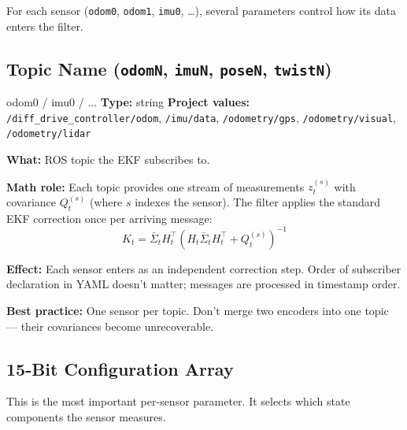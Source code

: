 \documentclass[11pt,a4paper]{article}
\begin{document}
For each sensor (\texttt{odom0}, \texttt{odom1}, \texttt{imu0}, \ldots), several parameters control how its data enters the filter.

\subsection{Topic Name (\texttt{odomN}, \texttt{imuN}, \texttt{poseN}, \texttt{twistN})}

\begin{paramcard}{odom0 / imu0 / ...}
\textbf{Type:} string \quad \textbf{Project values:} \texttt{/diff\_drive\_controller/odom}, \texttt{/imu/data}, \texttt{/odometry/gps}, \texttt{/odometry/visual}, \texttt{/odometry/lidar}

\textbf{What:} ROS topic the EKF subscribes to.

\textbf{Math role:} Each topic provides one stream of measurements $z^{(s)}_t$ with covariance $Q^{(s)}_t$ (where $s$ indexes the sensor). The filter applies the standard EKF correction once per arriving message:
\[
K_t = \bar{\Sigma}_t H_t^\top (H_t \bar{\Sigma}_t H_t^\top + Q^{(s)}_t)^{-1}
\]

\textbf{Effect:} Each sensor enters as an independent correction step. Order of subscriber declaration in YAML doesn't matter; messages are processed in timestamp order.

\textbf{Best practice:} One sensor per topic. Don't merge two encoders into one topic --- their covariances become unrecoverable.
\end{paramcard}

\subsection{15-Bit Configuration Array}

This is the most important per-sensor parameter. It selects which state components the sensor measures.
\end{document}

